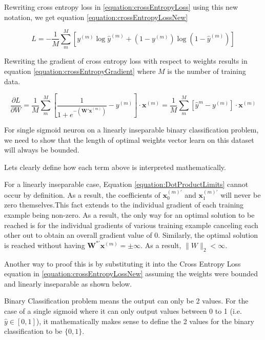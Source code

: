 \documentclass[a4paper,12pt]{article}
\begin{document}
Rewriting cross entropy loss in \ref{equation:crossEntropyLoss} using this new notation, we get equation \ref{equation:crossEntropyLossNew}

\begin{equation}
\label{equation:crossEntropyLossNew}
L = - \frac{1}{M} \sum_m^M [ y^{(m)} \log \hat{y}^{(m)} +
	(1 - y^{(m)} ) \log ( 1 - \hat{y}^{(m)} )]
\end{equation}

Rewriting the gradient of cross entropy loss with respect to weights results in equation \ref{equation:crossEntropyGradient} where $M$ is the number of training data. 

\begin{equation}
\label{equation:crossEntropyGradient}
\frac{\partial L}{\partial W} = \frac{1}{M} \sum_m^M [ \frac{1}{1 + e^{- (\mathbf{W'x}^{(m)})}} - y^{(m)} ] \cdot \mathbf{x}^{(m)} = \frac{1}{M} \sum_m^M [ \hat{y}^{m} - y^{(m)} ] \cdot \mathbf{x}^{(m)} 
\end{equation}

For single sigmoid neuron on a linearly inseparable binary classification problem, we need to show that the length of optimal weights vector learn on this dataset will always be bounded. 

Lets clearly define how each term above is interpreted mathematically. 

For a linearly inseparable case, Equation \ref{equation:DotProductLimits} cannot occur by definition. As a result, the coefficients of $\mathbf{x}_0^{(m)'}$ and $\mathbf{x}_1^{(m)'}$ will never be zero themselves.This fact extends to the individual gradient of each training example being non-zero. As a result, the only way for an optimal solution to be reached is for the individual gradients of various training example canceling each other out to obtain an overall gradient value of 0. Similarly, the optimal solution is reached without having $\mathbf{W}^{*'} \mathbf{x}^{(m)} = \pm \infty$. As a result, $\|W\|_2 < \infty$.

Another way to proof this is by substituting it into the Cross Entropy Loss equation in \ref{equation:crossEntropyLossNew} assuming the weights were bounded and linearly inseparable as shown below. 

Binary Classification problem means the output can only be 2 values. For the case of a single sigmoid where it can only output values between 0 to 1 (i.e. $\hat{y} \in [0, 1]$), it mathematically makes sense to define the 2 values for the binary classification to be $\{0, 1\}$. 
\end{document}
